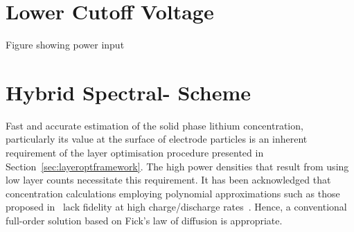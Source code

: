 

\section{Lower Cutoff Voltage}\label{sec:cutoff}


Figure showing power input

\section{Hybrid Spectral- Scheme}\label{sec:hybridfv-spectral}

Fast  and  accurate  estimation  of   the  solid  phase  lithium  concentration,
particularly  its   value  at   the  surface  of   electrode  particles   is  an
inherent  requirement   of  the   layer  optimisation  procedure   presented  in
Section~\ref{sec:layeroptframework}.  The  high   power  densities  that  result
from  using  low  layer  counts   necessitate  this  requirement.  It  has  been
acknowledged that concentration calculations employing polynomial approximations
such  as   those  proposed   in~\cite{Santhanagopalan2006a}  lack   fidelity  at
high  charge/discharge rates~\cite{Santhanagopalan2006}.  Hence, a  conventional
full-order solution based on Fick's law of diffusion is appropriate.

